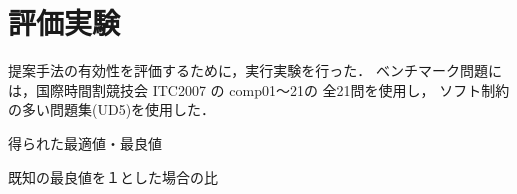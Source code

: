 \section{評価実験}
提案手法の有効性を評価するために，実行実験を行った．
ベンチマーク問題には，国際時間割競技会 ITC2007 の comp01〜21の
全21問を使用し，
ソフト制約の多い問題集(UD5)を使用した．

\begin{table*}[tbp]
  \label{table:bench:result1}
  \begin{center}
  \caption{得られた最適値・最良値}
\begin{tableA}
    
  \end{tableA}
  \end{center}
\end{table*}

\begin{table*}[tbp]
  \label{table:bench:result2}
  \centering
   \caption{既知の最良値を１とした場合の比}
  \begin{tableA}
    
  \end{tableA}
\end{table*}